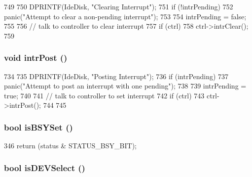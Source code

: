 \begin{DoxyCode}
749 {
750     DPRINTF(IdeDisk, "Clearing Interrupt\n");
751     if (!intrPending)
752         panic("Attempt to clear a non-pending interrupt\n");
753 
754     intrPending = false;
755 
756     // talk to controller to clear interrupt
757     if (ctrl)
758         ctrl->intrClear();
759 }
\end{DoxyCode}
\hypertarget{classIdeDisk_aba6fa755ca152cedafeb4150da6a2493}{
\subsubsection[{intrPost}]{\setlength{\rightskip}{0pt plus 5cm}void intrPost ()}}
\label{classIdeDisk_aba6fa755ca152cedafeb4150da6a2493}



\begin{DoxyCode}
734 {
735     DPRINTF(IdeDisk, "Posting Interrupt\n");
736     if (intrPending)
737         panic("Attempt to post an interrupt with one pending\n");
738 
739     intrPending = true;
740 
741     // talk to controller to set interrupt
742     if (ctrl) {
743         ctrl->intrPost();
744     }
745 }
\end{DoxyCode}
\hypertarget{classIdeDisk_a61117d164479a7bbd3ed3d9afc8e261b}{
\subsubsection[{isBSYSet}]{\setlength{\rightskip}{0pt plus 5cm}bool isBSYSet ()}}
\label{classIdeDisk_a61117d164479a7bbd3ed3d9afc8e261b}



\begin{DoxyCode}
346 { return (status & STATUS_BSY_BIT); }
\end{DoxyCode}
\hypertarget{classIdeDisk_a910d3c770ea864b505ae99ee7e674640}{
\subsubsection[{isDEVSelect}]{\setlength{\rightskip}{0pt plus 5cm}bool isDEVSelect ()}}
\label{classIdeDisk_a910d3c770ea864b505ae99ee7e674640}



